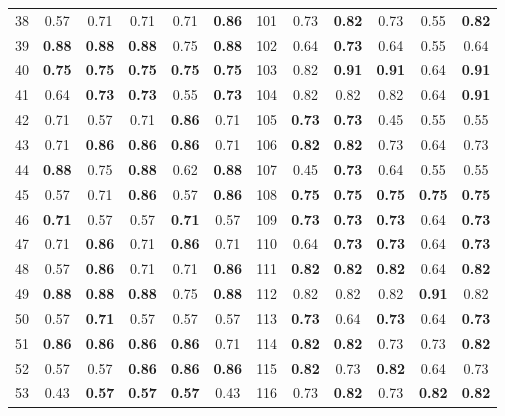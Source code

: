 \documentclass{article}
\begin{document}
{\begin{longtable}{cccccc@{\qquad}cccccc}
38 & 0.57 & 0.71 & 0.71 & 0.71 & \textbf{0.86} & 101 & 0.73 & \textbf{0.82} & 0.73 & 0.55 & \textbf{0.82} \\
39 & \textbf{0.88} & \textbf{0.88} & \textbf{0.88} & 0.75 & \textbf{0.88} & 102 & 0.64 & \textbf{0.73} & 0.64 & 0.55 & 0.64 \\
40 & \textbf{0.75} & \textbf{0.75} & \textbf{0.75} & \textbf{0.75} & \textbf{0.75} & 103 & 0.82 & \textbf{0.91} & \textbf{0.91} & 0.64 & \textbf{0.91} \\
41 & 0.64 & \textbf{0.73} & \textbf{0.73} & 0.55 & \textbf{0.73} & 104 & 0.82 & 0.82 & 0.82 & 0.64 & \textbf{0.91} \\
42 & 0.71 & 0.57 & 0.71 & \textbf{0.86} & 0.71 & 105 & \textbf{0.73} & \textbf{0.73} & 0.45 & 0.55 & 0.55 \\
43 & 0.71 & \textbf{0.86} & \textbf{0.86} & \textbf{0.86} & 0.71 & 106 & \textbf{0.82} & \textbf{0.82} & 0.73 & 0.64 & 0.73 \\
44 & \textbf{0.88} & 0.75 & \textbf{0.88} & 0.62 & \textbf{0.88} & 107 & 0.45 & \textbf{0.73} & 0.64 & 0.55 & 0.55 \\
45 & 0.57 & 0.71 & \textbf{0.86} & 0.57 & \textbf{0.86} & 108 & \textbf{0.75} & \textbf{0.75} & \textbf{0.75} & \textbf{0.75} & \textbf{0.75} \\
46 & \textbf{0.71} & 0.57 & 0.57 & \textbf{0.71} & 0.57 & 109 & \textbf{0.73} & \textbf{0.73} & \textbf{0.73} & 0.64 & \textbf{0.73} \\
47 & 0.71 & \textbf{0.86} & 0.71 & \textbf{0.86} & 0.71 & 110 & 0.64 & \textbf{0.73} & \textbf{0.73} & 0.64 & \textbf{0.73} \\
48 & 0.57 & \textbf{0.86} & 0.71 & 0.71 & \textbf{0.86} & 111 & \textbf{0.82} & \textbf{0.82} & \textbf{0.82} & 0.64 & \textbf{0.82} \\
49 & \textbf{0.88} & \textbf{0.88} & \textbf{0.88} & 0.75 & \textbf{0.88} & 112 & 0.82 & 0.82 & 0.82 & \textbf{0.91} & 0.82 \\
50 & 0.57 & \textbf{0.71} & 0.57 & 0.57 & 0.57 & 113 & \textbf{0.73} & 0.64 & \textbf{0.73} & 0.64 & \textbf{0.73} \\
51 & \textbf{0.86} & \textbf{0.86} & \textbf{0.86} & \textbf{0.86} & 0.71 & 114 & \textbf{0.82} & \textbf{0.82} & 0.73 & 0.73 & \textbf{0.82} \\
52 & 0.57 & 0.57 & \textbf{0.86} & \textbf{0.86} & \textbf{0.86} & 115 & \textbf{0.82} & 0.73 & \textbf{0.82} & 0.64 & 0.73 \\
53 & 0.43 & \textbf{0.57} & \textbf{0.57} & \textbf{0.57} & 0.43 & 116 & 0.73 & \textbf{0.82} & 0.73 & \textbf{0.82} & \textbf{0.82} \\

\end{longtable}}
\end{document}
